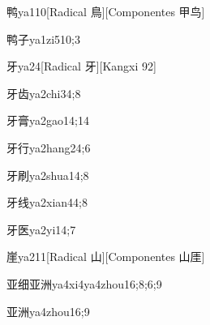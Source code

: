 \begin{verbete}{鸭}{ya1}{10}[Radical 鳥][Componentes 甲鸟]
\end{verbete}

\begin{verbete}{鸭子}{ya1zi5}{10;3}
\end{verbete}

\begin{verbete}{牙}{ya2}{4}[Radical 牙][Kangxi 92]
\end{verbete}

\begin{verbete}{牙齿}{ya2chi3}{4;8}
\end{verbete}

\begin{verbete}{牙膏}{ya2gao1}{4;14}
\end{verbete}

\begin{verbete}{牙行}{ya2hang2}{4;6}
\end{verbete}

\begin{verbete}{牙刷}{ya2shua1}{4;8}
\end{verbete}

\begin{verbete}{牙线}{ya2xian4}{4;8}
\end{verbete}

\begin{verbete}{牙医}{ya2yi1}{4;7}
\end{verbete}

\begin{verbete}{崖}{ya2}{11}[Radical 山][Componentes 山厓]
\end{verbete}

\begin{verbete}{亚细亚洲}{ya4xi4ya4zhou1}{6;8;6;9}
\end{verbete}

\begin{verbete}{亚洲}{ya4zhou1}{6;9}
\end{verbete}

